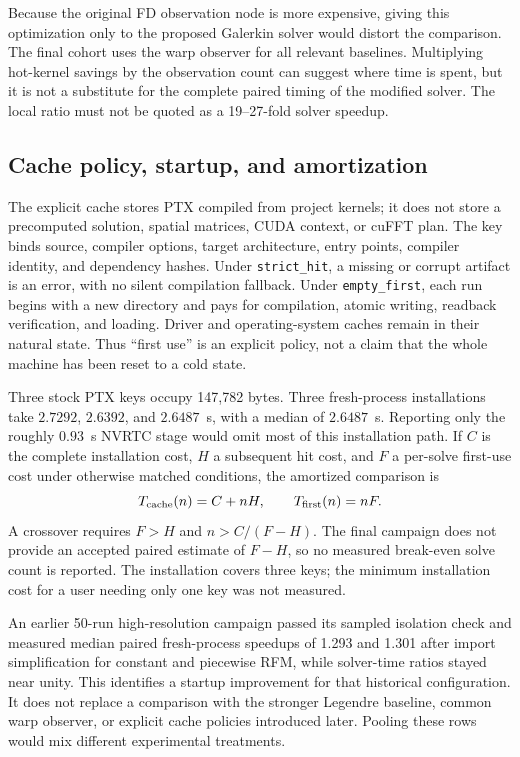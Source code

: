 Because the original FD observation node is more expensive, giving this optimization only to the proposed Galerkin solver would distort the comparison. The final cohort uses the warp observer for all relevant baselines. Multiplying hot-kernel savings by the observation count can suggest where time is spent, but it is not a substitute for the complete paired timing of the modified solver. The local ratio must not be quoted as a 19--27-fold solver speedup.

\subsection{Cache policy, startup, and amortization}

The explicit cache stores PTX compiled from project kernels; it does not store a precomputed solution, spatial matrices, CUDA context, or cuFFT plan. The key binds source, compiler options, target architecture, entry points, compiler identity, and dependency hashes. Under \texttt{strict\_hit}, a missing or corrupt artifact is an error, with no silent compilation fallback. Under \texttt{empty\_first}, each run begins with a new directory and pays for compilation, atomic writing, readback verification, and loading. Driver and operating-system caches remain in their natural state. Thus ``first use'' is an explicit policy, not a claim that the whole machine has been reset to a cold state.

Three stock PTX keys occupy 147,782 bytes. Three fresh-process installations take $2.7292$, $2.6392$, and $2.6487$~s, with a median of $2.6487$~s. Reporting only the roughly $0.93$~s NVRTC stage would omit most of this installation path. If $C$ is the complete installation cost, $H$ a subsequent hit cost, and $F$ a per-solve first-use cost under otherwise matched conditions, the amortized comparison is
\begin{equation}
\label{eq:cache-amortization}
 T_{\rm cache}(n)=C+nH,\qquad T_{\rm first}(n)=nF.
\end{equation}
A crossover requires $F>H$ and $n>C/(F-H)$. The final campaign does not provide an accepted paired estimate of $F-H$, so no measured break-even solve count is reported. The installation covers three keys; the minimum installation cost for a user needing only one key was not measured.

An earlier 50-run high-resolution campaign passed its sampled isolation check and measured median paired fresh-process speedups of 1.293 and 1.301 after import simplification for constant and piecewise RFM, while solver-time ratios stayed near unity. This identifies a startup improvement for that historical configuration. It does not replace a comparison with the stronger Legendre baseline, common warp observer, or explicit cache policies introduced later. Pooling these rows would mix different experimental treatments.

